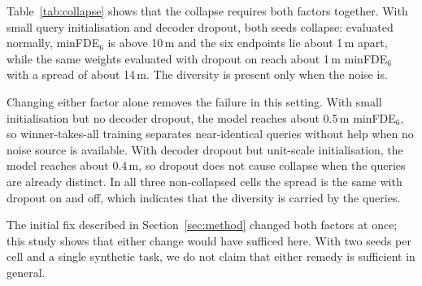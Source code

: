 Table~\ref{tab:collapse} shows that the collapse requires both factors together. With small
query initialisation and decoder dropout, both seeds collapse: evaluated normally, minFDE$_6$
is above 10\,m and the six endpoints lie about 1\,m apart, while the same weights evaluated
with dropout on reach about 1\,m minFDE$_6$ with a spread of about 14\,m. The diversity is
present only when the noise is.

Changing either factor alone removes the failure in this setting. With small initialisation
but no decoder dropout, the model reaches about 0.5\,m minFDE$_6$, so winner-takes-all training
separates near-identical queries without help when no noise source is available. With decoder
dropout but unit-scale initialisation, the model reaches about 0.4\,m, so dropout does not
cause collapse when the queries are already distinct. In all three non-collapsed cells the
spread is the same with dropout on and off, which indicates that the diversity is carried by
the queries.

The initial fix described in Section~\ref{sec:method} changed both factors at once; this study
shows that either change would have sufficed here. With two seeds per cell and a single
synthetic task, we do not claim that either remedy is sufficient in general.
